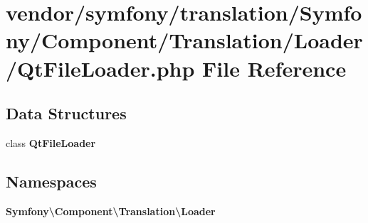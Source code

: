 \section{vendor/symfony/translation/\+Symfony/\+Component/\+Translation/\+Loader/\+Qt\+File\+Loader.php File Reference}
\label{_qt_file_loader_8php}
\subsection*{Data Structures}
\begin{DoxyCompactItemize}
\item 
class {\bf Qt\+File\+Loader}
\end{DoxyCompactItemize}
\subsection*{Namespaces}
\begin{DoxyCompactItemize}
\item 
 {\bf Symfony\textbackslash{}\+Component\textbackslash{}\+Translation\textbackslash{}\+Loader}
\end{DoxyCompactItemize}
